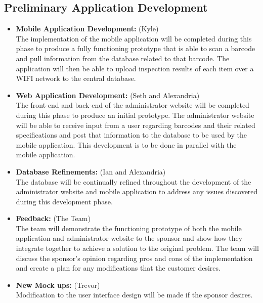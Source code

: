 \documentclass[Letter,11pt]{article}
\begin{document}
		\subsection{Preliminary Application Development}\label{dev1}
		
		\begin{itemize}
			\item\textbf{Mobile Application Development:} (Kyle)\\
		The implementation of the mobile application will be completed during this phase to produce a fully functioning prototype that is able to scan a barcode and pull information from the database related to that barcode.  The application will then be able to upload inspection results of each item over a WIFI network to the central database.\\		
			\item \textbf{Web Application Development:} (Seth and Alexandria)\\
			The front-end and back-end of the administrator website will be completed during this phase to produce an initial prototype. The administrator website will be able to receive input from a user regarding barcodes and their related specifications and post that information to the database to be used by the mobile application. This development is to be done in parallel with the mobile application.\\

			\item\textbf{Database Refinements:} (Ian and Alexandria)\\
			The database will be continually refined throughout the development of the administrator website and mobile application to address any issues discovered during this development phase.\\
			\item\textbf{Feedback:} (The Team)\\
			The team will demonstrate the functioning prototype of both the mobile application and administrator website to the sponsor and show how they integrate together to achieve a solution to the original problem.  The team will discuss the sponsor’s opinion regarding pros and cons of the implementation and create a plan for any modifications that the customer desires.\\
			\item\textbf{New Mock ups:} (Trevor)\\
			Modification to the user interface design will be made if the sponsor desires.
		\end{itemize}
		
\end{document}
